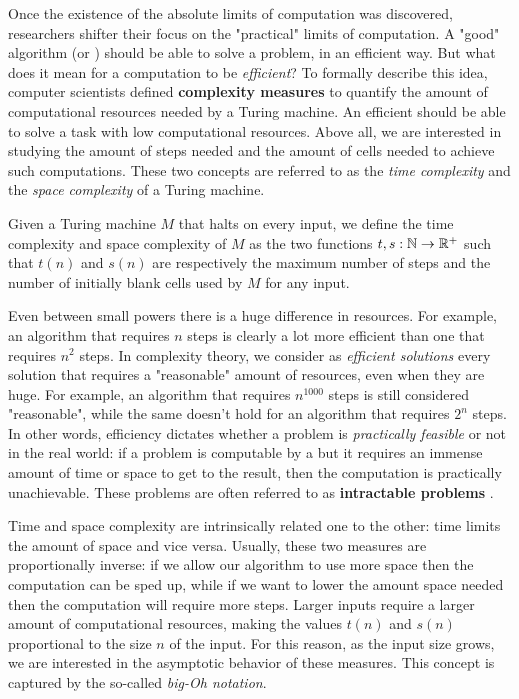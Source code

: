 Once the existence of the absolute limits of computation was discovered, researchers shifter their focus on the "practical" limits of computation. A "good" algorithm (or \TM) should be able to solve a problem, in an efficient way. But what does it mean for a computation to be \textit{efficient}? To formally describe this idea, computer scientists defined \textbf{complexity measures} to quantify the amount of computational resources needed by a Turing machine. An efficient \TM should be able to solve a task with low computational resources. Above all, we are interested in studying the amount of steps needed and the amount of cells needed to achieve such computations. These two concepts are referred to as the \textit{time complexity} and the \textit{space complexity} of a Turing machine.

\begin{definition}
 Given a Turing machine $M$ that halts on every input, we define the time complexity and space complexity of $M$ as the two functions $t, s : \mathbb{N} \to \mathbb{R}^+$ such that $t(n)$ and $s(n)$ are respectively the maximum number of steps and the number of initially blank cells used by $M$ for any input.
\end{definition}

Even between small powers there is a huge difference in resources. For example, an algorithm that requires $n$ steps is clearly a lot more efficient than one that requires $n^2$ steps. In complexity theory, we consider as \textit{efficient solutions} every solution that requires a "reasonable" amount of resources, even when they are huge. For example, an algorithm that requires $n^{1000}$ steps is still considered "reasonable", while the same doesn't hold for an algorithm that requires $2^n$ steps. In other words, efficiency dictates whether a problem is \textit{practically feasible} or not in the real world: if a problem is computable by a \TM but it requires an immense amount of time or space to get to the result, then the computation is practically unachievable. These problems are often referred to as \textbf{intractable problems} \cite{complexity_arora_barak,sipser_computation}.

Time and space complexity are intrinsically related one to the other: time limits the amount of space and vice versa. Usually, these two measures are proportionally inverse: if we allow our algorithm to use more space then the computation can be sped up, while if we want to lower the amount space needed then the computation will require more steps. Larger inputs require a larger amount of computational resources, making the values $t(n)$ and $s(n)$ proportional to the size $n$ of the input. For this reason, as the input size grows, we are interested in the asymptotic behavior of these measures. This concept is captured by the so-called \textit{big-Oh notation}.

